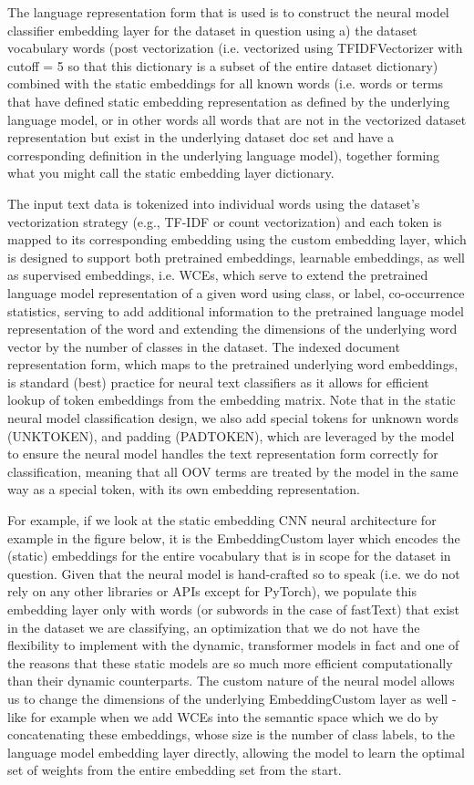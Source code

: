 \documentclass[final]{clv2025-revised}
\begin{document}
The language representation form that is used is to construct the neural model classifier embedding layer for the dataset in question using a) the dataset vocabulary words (post vectorization (i.e. vectorized using TFIDFVectorizer with cutoff = 5 so that this dictionary is a subset of the entire dataset dictionary) combined with the static embeddings for all known words (i.e. words or terms that have defined static embedding representation as defined by the underlying language model, or in other words all words that are not in the vectorized dataset representation but exist in the underlying dataset doc set and have a corresponding definition in the underlying language model), together forming what you might call the static embedding layer dictionary. 

The input text data is tokenized into individual words using the dataset's vectorization strategy (e.g., TF-IDF or count vectorization) and each token is mapped to its corresponding embedding using the custom embedding layer, which is designed to support both pretrained embeddings, learnable embeddings, as well as supervised embeddings, i.e. WCEs, which serve to extend the pretrained language model representation of a given word using class, or label, co-occurrence statistics, serving to add additional information to the pretrained language model representation of the word and extending the dimensions of the underlying word vector by the number of classes in the dataset. The indexed document representation form, which maps to the pretrained underlying word embeddings, is standard (best) practice for neural text classifiers as it allows for efficient lookup of token embeddings from the embedding matrix. Note that in the static neural model classification design, we also add special tokens for unknown words (UNKTOKEN), and padding (PADTOKEN), which are leveraged by the model to ensure the neural model handles the text representation form correctly for classification, meaning that all OOV terms are treated by the model in the same way as a special token, with its own embedding representation. 

For example, if we look at the static embedding CNN neural architecture for example in the figure below, it is the EmbeddingCustom layer which encodes the (static) embeddings for the entire vocabulary that is in scope for the dataset in question. Given that the neural model is hand-crafted so to speak (i.e. we do not rely on any other libraries or APIs except for PyTorch), we populate this embedding layer only with words (or subwords in the case of fastText) that exist in the dataset we are classifying, an optimization that we do not have the flexibility to implement with the dynamic, transformer models in fact and one of the reasons that these static models are so much more efficient computationally than their dynamic counterparts. The custom nature of the neural model allows us to change the dimensions of the underlying EmbeddingCustom layer as well - like for example when we add WCEs into the semantic space which we do by concatenating these embeddings, whose size is the number of class labels, to the language model embedding layer directly, allowing the model to learn the optimal set of weights from the entire embedding set from the start.
\end{document}
